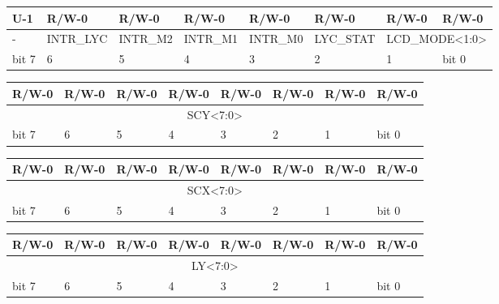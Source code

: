 \documentclass[a4paper, draft, oneside]{memoir}
\newcommand{\hex}[1]{\texttt{0x#1}}
\begin{document}
\begin{register}[H]
  \caption{\hex{FF41} - LCDC - PPU status register}
  {
    \ttfamily
    \begin{tabularx}{\textwidth}{|X|X|X|X|X|X|X|X|}
      \hline
      U-1                     & R/W-0     & R/W-0    & R/W-0    & R/W-0    & R/W-0     & R/W-0                                & R/W-0 \\
      \hline
      \cellcolor{LightGray} - & INTR\_LYC & INTR\_M2 & INTR\_M1 & INTR\_M0 & LYC\_STAT & \multicolumn{2}{c|}{LCD\_MODE<1:0>} \\
      \hline
      bit 7                   & 6         & 5        & 4        & 3        & 2         & 1                                    & bit 0 \\
      \hline
    \end{tabularx}
  }
\end{register}

\begin{register}[H]
  \caption{\hex{FF42} - SCY - Vertical scroll register}
  {
    \ttfamily
    \begin{tabularx}{\textwidth}{|X|X|X|X|X|X|X|X|}
      \hline
      R/W-0                           & R/W-0 & R/W-0 & R/W-0 & R/W-0 & R/W-0 & R/W-0 & R/W-0 \\
      \hline
      \multicolumn{8}{|c|}{SCY<7:0>} \\
      \hline
      bit 7                           & 6     & 5     & 4     & 3     & 2     & 1     & bit 0 \\
      \hline
    \end{tabularx}
  }
\end{register}

\begin{register}[H]
  \caption{\hex{FF43} - SCX - Horizontal scroll register}
  {
    \ttfamily
    \begin{tabularx}{\textwidth}{|X|X|X|X|X|X|X|X|}
      \hline
      R/W-0                           & R/W-0 & R/W-0 & R/W-0 & R/W-0 & R/W-0 & R/W-0 & R/W-0 \\
      \hline
      \multicolumn{8}{|c|}{SCX<7:0>} \\
      \hline
      bit 7                           & 6     & 5     & 4     & 3     & 2     & 1     & bit 0 \\
      \hline
    \end{tabularx}
  }
\end{register}

\begin{register}[H]
  \caption{\hex{FF44} - LY - Scanline register}
  {
    \ttfamily
    \begin{tabularx}{\textwidth}{|X|X|X|X|X|X|X|X|}
      \hline
      R/W-0                          & R/W-0 & R/W-0 & R/W-0 & R/W-0 & R/W-0 & R/W-0 & R/W-0 \\
      \hline
      \multicolumn{8}{|c|}{LY<7:0>} \\
      \hline
      bit 7                          & 6     & 5     & 4     & 3     & 2     & 1     & bit 0 \\
      \hline
    \end{tabularx}
  }
\end{register}
\end{document}
